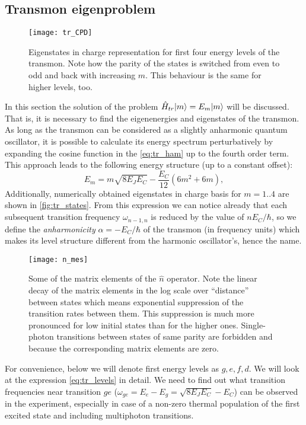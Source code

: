 \subsection{Transmon eigenproblem}\label{sec:tr_eigen}

\begin{figure}
\centering
\texttt{[image: tr\_CPD]}
\caption{Eigenstates in charge representation for first four energy levels of the transmon. Note how the parity of the states is switched from even to odd and back with increasing $m$. This behaviour is the same for higher levels, too.}
\label{fig:tr_states}
\end{figure}

In this section the solution of the problem $\hat H_{tr} \lvert m\rangle = E_m \lvert m\rangle$ will be discussed. That is, it is necessary to find the eigenenergies and eigenstates of the transmon. As long as the transmon can be considered as a slightly anharmonic quantum oscillator, it is possible to calculate its energy spectrum perturbatively by expanding the cosine function in the \eqref{eq:tr_ham} up to the fourth order term. This approach leads\cite{Koch2007} to the following energy structure (up to a constant offset):
\begin{equation}
E_m = m \sqrt{8E_J E_C} -\frac{E_C}{12}(6m^2+6m),
\label{eq:tr_levels}
\end{equation}
Additionally, numerically obtained eigenstates in charge basis for $m=1..4$ are shown in \autoref{fig:tr_states}. From this expression we can notice already that each subsequent transition frequency $\omega_{n-1,n}$ is reduced by the value of $n E_C/\hbar$, so we define the \textit{anharmonicity} $\alpha = -E_C/\hbar$ of the transmon (in frequency units) which makes its level structure different from the harmonic oscillator's, hence the name.

\begin{figure}
\centering
\texttt{[image: n\_mes]}
\caption{Some of the matrix elements of the $\hat n$ operator. Note the linear decay of the matrix elements in the log scale over ``distance'' between states which means exponential suppression of the transition rates between them. This suppression is much more pronounced for low initial states than for the higher ones. Single-photon transitions between states of same parity are forbidden and because the corresponding matrix elements are zero.}
\label{fig:n_mes}
\end{figure}


For convenience, below we will denote first energy levels as $g,e,f,d$. We will look at the expression \eqref{eq:tr_levels} in detail. We need to find out what transition frequencies near transition $ge$ ($\omega_{ge} = E_e - E_g = \sqrt{8E_J E_C} - E_C$) can be observed in the experiment, especially in case of a non-zero thermal population of the first excited state and including multiphoton transitions. 

